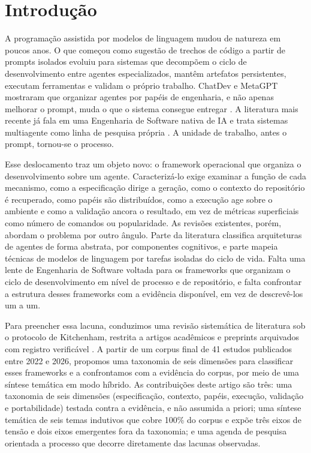 \section{Introdução}

A programação assistida por modelos de linguagem mudou de natureza em poucos anos. O que começou como sugestão de trechos de código a partir de prompts isolados evoluiu para sistemas que decompõem o ciclo de desenvolvimento entre agentes especializados, mantêm artefatos persistentes, executam ferramentas e validam o próprio trabalho. ChatDev e MetaGPT mostraram que organizar agentes por papéis de engenharia, e não apenas melhorar o prompt, muda o que o sistema consegue entregar \cite{ChenQian2023,SiruiHong2023}. A literatura mais recente já fala em uma Engenharia de Software nativa de IA e trata sistemas multiagente como linha de pesquisa própria \cite{hou2024llmse,AhmedEHassan2024,JundaHe2025}. A unidade de trabalho, antes o prompt, tornou-se o processo.

Esse deslocamento traz um objeto novo: o framework operacional que organiza o desenvolvimento sobre um agente. Caracterizá-lo exige examinar a função de cada mecanismo, como a especificação dirige a geração, como o contexto do repositório é recuperado, como papéis são distribuídos, como a execução age sobre o ambiente e como a validação ancora o resultado, em vez de métricas superficiais como número de comandos ou popularidade. As revisões existentes, porém, abordam o problema por outro ângulo. Parte da literatura classifica arquiteturas de agentes de forma abstrata, por componentes cognitivos, e parte mapeia técnicas de modelos de linguagem por tarefas isoladas do ciclo de vida. Falta uma lente de Engenharia de Software voltada para os frameworks que organizam o ciclo de desenvolvimento em nível de processo e de repositório, e falta confrontar a estrutura desses frameworks com a evidência disponível, em vez de descrevê-los um a um.

Para preencher essa lacuna, conduzimos uma revisão sistemática de literatura sob o protocolo de Kitchenham, restrita a artigos acadêmicos e preprints arquivados com registro verificável \cite{kitchenham2009slr}. A partir de um corpus final de 41 estudos publicados entre 2022 e 2026, propomos uma taxonomia de seis dimensões para classificar esses frameworks e a confrontamos com a evidência do corpus, por meio de uma síntese temática em modo híbrido. As contribuições deste artigo são três: uma taxonomia de seis dimensões (especificação, contexto, papéis, execução, validação e portabilidade) testada contra a evidência, e não assumida a priori; uma síntese temática de seis temas indutivos que cobre 100\% do corpus e expõe três eixos de tensão e dois eixos emergentes fora da taxonomia; e uma agenda de pesquisa orientada a processo que decorre diretamente das lacunas observadas.

